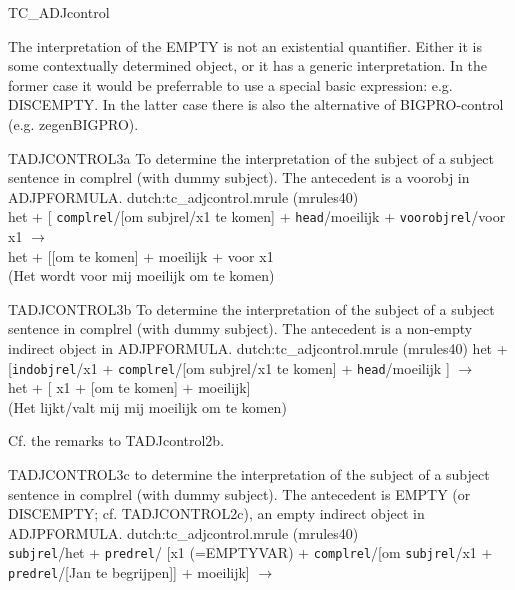 \begin{mruleclass}{TC\_ADJcontrol}
\begin{members}
\begin{member}
\remarks\mbox{}
The interpretation of the EMPTY is not an existential quantifier. Either 
it is some
contextually determined object, or it has a generic interpretation.
In the former case it would be preferrable to use a special basic expression: 
e.g. DISCEMPTY. In the latter case there is also the alternative of 
BIGPRO-control (e.g. zegenBIGPRO).  
\end{member}
\begin{member}
 TADJCONTROL3a
 To determine the interpretation of the subject of a
subject sentence in complrel (with dummy subject). 
The antecedent is a
voorobj in ADJPFORMULA.
\file dutch:tc\_adjcontrol.mrule (mrules40)
\semantics \nosemantics
\example\mbox{}\\
het + [
{\tt complrel}/[om subjrel/x1 te komen] +
{\tt head}/moeilijk + 
{\tt voorobjrel}/voor x1 
$\rightarrow$\\
het + [[om te komen] + moeilijk + voor x1 \\
(Het wordt voor mij moeilijk om te komen)

\remarks\mbox{}

\end{member}
\begin{member}
 TADJCONTROL3b
 To determine the interpretation of the subject of a
subject sentence in complrel 
(with dummy subject). 
The antecedent 
is a non-empty indirect object 
in ADJPFORMULA.
\file dutch:tc\_adjcontrol.mrule (mrules40)
\semantics \nosemantics
\example\mbox{}
het + [{\tt indobjrel}/x1 + 
{\tt complrel}/[om subjrel/x1 te komen] +
{\tt head}/moeilijk ]
$\rightarrow$\\
het + [ x1 + [om te komen] + moeilijk] \\
(Het lijkt/valt mij mij moeilijk om te komen)

\remarks\mbox{}
Cf. the remarks to TADJcontrol2b. 

\end{member}
\begin{member}
 TADJCONTROL3c
 to determine the interpretation of the subject of a subject
sentence in complrel (with dummy subject). 
The antecedent is EMPTY (or DISCEMPTY; cf. TADJCONTROL2c), an empty 
indirect object in ADJPFORMULA.
\file dutch:tc\_adjcontrol.mrule (mrules40)
\semantics \nosemantics
\example\mbox{}\\
{\tt subjrel}/het + {\tt predrel}/
[x1 (=EMPTYVAR) + 
{\tt complrel}/[om {\tt subjrel}/x1 
+ {\tt predrel}/[Jan te begrijpen]] + moeilijk] $\rightarrow$ \\


\end{member}
\end{members}
\end{mruleclass}
